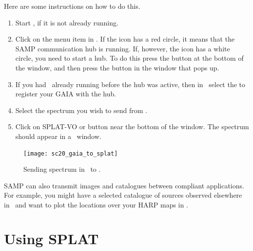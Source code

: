 \documentclass[11pt,oneside,chapters]{starlink}
\begin{document}
Here are some instructions on how to do this.

\begin{enumerate}[label=(\textbf{\arabic*})]

\item Start \splat, if it is not already running.

\begin{terminalv}
\end{terminalv}

\item Click on the  menu item in \splat.  If the
 icon has a red circle, it means that the SAMP
communication hub is running.  If, however, the icon has a white
circle, you need to start a hub.  To do this press the
 button at the bottom of the window, and
then press the  button in the window that
pops up.

\item If you had \gaia\ already running before the hub was active, then in
\gaia\ select the  to register your GAIA with
the hub.

\item Select the spectrum you wish to send from \gaia.

\item Click on SPLAT-VO  or 
button near the bottom of the 
window.  The spectrum should appear in a \splat\ window.

\end{enumerate}

\begin{figure}[h!]
\begin{center}
\texttt{[image: sc20\_gaia\_to\_splat]}
\caption[Sending spectrum in \gaia\ to \splat.]{\label{fig:gaia_to_splat}
  Sending spectrum in \gaia\ to \splat.}
\end{center}
\end{figure}

SAMP can also transmit images and catalogues between compliant
applications.  For example, you might have a selected catalogue of
sources observed elsewhere in \topcat\ and want to plot the locations
over your HARP maps in \gaia.


\clearpage
\chapter{Using SPLAT}
\label{sec:splat}
\end{document}
